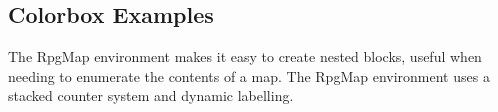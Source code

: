 		\subsection{Colorbox Examples}
	


			




		The RpgMap environment makes it easy to create nested blocks, useful when needing to enumerate the contents of a map. The RpgMap environment uses a stacked counter system and dynamic labelling.
		
			

